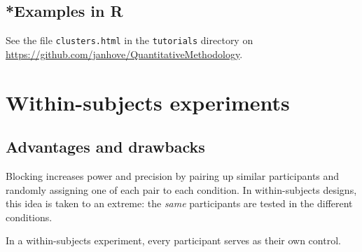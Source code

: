 \documentclass[a4paper]{tufte-book}\usepackage[]{graphicx}\usepackage[]{xcolor}
\begin{document}
\section{*Examples in R}
See the file \texttt{clusters.html}
in the \texttt{tutorials} directory on \url{https://github.com/janhove/QuantitativeMethodology}.


\chapter{Within-subjects experiments}

\section{Advantages and drawbacks}

Blocking increases power and precision by
pairing up similar participants and randomly assigning one of each pair to
each condition. In within-subjects designs, this idea is taken to an extreme:
the \emph{same} participants are tested in the different conditions.

\medskip

\begin{framed}
In a within-subjects experiment, every participant serves as their own control.
\end{framed}

\medskip
\end{document}
